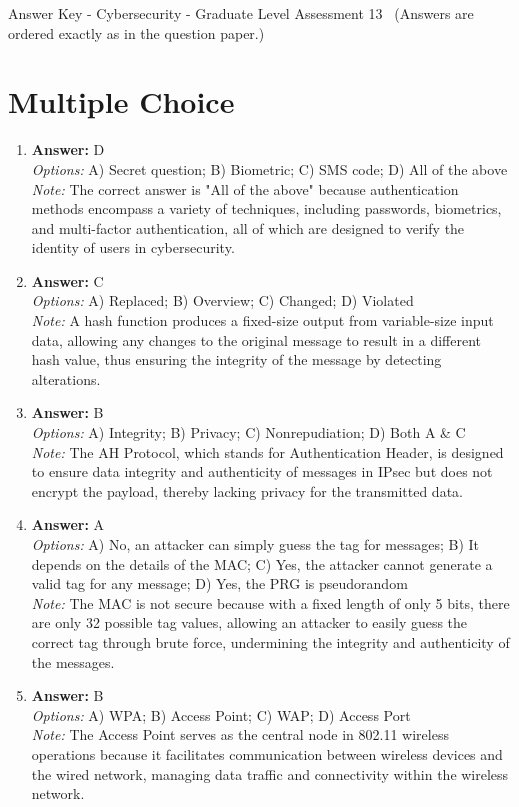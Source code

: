 \documentclass[12pt]{article}
\begin{document}
\begin{center}
Answer Key - Cybersecurity - Graduate Level Assessment 13 \
\small (Answers are ordered exactly as in the question paper.)
\end{center}

\section*{Multiple Choice}
\begin{enumerate}[label=\arabic*.]
\item \textbf{Answer:} D
\\ \textit{Options:} A) Secret question; B) Biometric; C) SMS code; D) All of the above
\\ \textit{Note:} The correct answer is "All of the above" because authentication methods encompass a variety of techniques, including passwords, biometrics, and multi-factor authentication, all of which are designed to verify the identity of users in cybersecurity.
\item \textbf{Answer:} C
\\ \textit{Options:} A) Replaced; B) Overview; C) Changed; D) Violated
\\ \textit{Note:} A hash function produces a fixed-size output from variable-size input data, allowing any changes to the original message to result in a different hash value, thus ensuring the integrity of the message by detecting alterations.
\item \textbf{Answer:} B
\\ \textit{Options:} A) Integrity; B) Privacy; C) Nonrepudiation; D) Both A \& C
\\ \textit{Note:} The AH Protocol, which stands for Authentication Header, is designed to ensure data integrity and authenticity of messages in IPsec but does not encrypt the payload, thereby lacking privacy for the transmitted data.
\item \textbf{Answer:} A
\\ \textit{Options:} A) No, an attacker can simply guess the tag for messages; B) It depends on the details of the MAC; C) Yes, the attacker cannot generate a valid tag for any message; D) Yes, the PRG is pseudorandom
\\ \textit{Note:} The MAC is not secure because with a fixed length of only 5 bits, there are only 32 possible tag values, allowing an attacker to easily guess the correct tag through brute force, undermining the integrity and authenticity of the messages.
\item \textbf{Answer:} B
\\ \textit{Options:} A) WPA; B) Access Point; C) WAP; D) Access Port
\\ \textit{Note:} The Access Point serves as the central node in 802.11 wireless operations because it facilitates communication between wireless devices and the wired network, managing data traffic and connectivity within the wireless network.
\end{enumerate}
\end{document}
